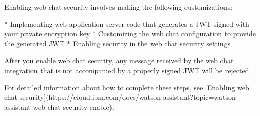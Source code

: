 \documentclass[a4paper,11pt]{article}
\begin{document}
\begin{docenv}
{Enabling web chat security involves making the following customizations:



* Implementing web application server code that generates a JWT signed with your private encryption key
* Customizing the web chat configuration to provide the generated JWT
* Enabling security in the web chat security settings

After you enable web chat security, any message received by the web chat integration that is not accompanied by a properly signed JWT will be rejected.



For detailed information about how to complete these steps, see [Enabling web chat security](https://cloud.ibm.com/docs/watson-assistant?topic=watson-assistant-web-chat-security-enable).}
\end{docenv}
\end{document}
